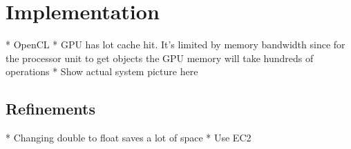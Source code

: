 \section{Implementation}

* OpenCL
* GPU has lot cache hit. It's limited by memory bandwidth since for the processor unit to get objects the GPU memory will take hundreds of operations
* Show actual system picture here
\subsection{Refinements}
* Changing double to float saves a lot of space
* Use EC2